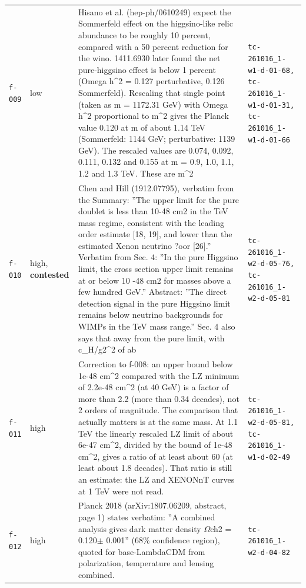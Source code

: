 \documentclass[11pt,a4paper]{article}
\begin{document}
\begin{longtable}{@{}p{}p{}p{}p{}@{}}
\texttt{f-009} & low & Hisano et al. (hep-ph/0610249) expect the Sommerfeld effect on the higgsino-like relic abundance to be roughly 10 percent, compared with a 50 percent reduction for the wino. 1411.6930 later found the net pure-higgsino effect is below 1 percent (Omega h\textasciicircum{}2 = 0.127 perturbative, 0.126 Sommerfeld). Rescaling that single point (taken as m = 1172.31 GeV) with Omega h\textasciicircum{}2 proportional to m\textasciicircum{}2 gives the Planck value 0.120 at m of about 1.14 TeV (Sommerfeld: 1144 GeV; perturbative: 1139 GeV). The rescaled values are 0.074, 0.092, 0.111, 0.132 and 0.155 at m = 0.9, 1.0, 1.1, 1.2 and 1.3 TeV. These are m\textasciicircum{}2  & \texttt{tc-261016\_\allowbreak{}1-w1-d-01-68,\allowbreak{} tc-261016\_\allowbreak{}1-w1-d-01-31,\allowbreak{} tc-261016\_\allowbreak{}1-w1-d-01-66} \\
\texttt{f-010} & high, \textbf{contested} & Chen and Hill (1912.07795), verbatim from the Summary: ''The upper limit for the pure doublet is less than 10-48 cm2 in the TeV mass regime, consistent with the leading order estimate [18, 19], and lower than the estimated Xenon neutrino ?oor [26].'' Verbatim from Sec. 4: ''In the pure Higgsino limit, the cross section upper limit remains at or below 10 -48 cm2 for masses above a few hundred GeV.'' Abstract: ''The direct detection signal in the pure Higgsino limit remains below neutrino backgrounds for WIMPs in the TeV mass range.'' Sec. 4 also says that away from the pure limit, with c\_H/g2\textasciicircum{}2 of ab & \texttt{tc-261016\_\allowbreak{}1-w2-d-05-76,\allowbreak{} tc-261016\_\allowbreak{}1-w2-d-05-81} \\
\texttt{f-011} & high & Correction to f-008: an upper bound below 1e-48 cm\textasciicircum{}2 compared with the LZ minimum of 2.2e-48 cm\textasciicircum{}2 (at 40 GeV) is a factor of more than 2.2 (more than 0.34 decades), not 2 orders of magnitude. The comparison that actually matters is at the same mass. At 1.1 TeV the linearly rescaled LZ limit of about 6e-47 cm\textasciicircum{}2, divided by the bound of 1e-48 cm\textasciicircum{}2, gives a ratio of at least about 60 (at least about 1.8 decades). That ratio is still an estimate: the LZ and XENONnT curves at 1 TeV were not read. & \texttt{tc-261016\_\allowbreak{}1-w2-d-05-81,\allowbreak{} tc-261016\_\allowbreak{}1-w1-d-02-49} \\
\texttt{f-012} & high & Planck 2018 (arXiv:1807.06209, abstract, page 1) states verbatim: ''A combined analysis gives dark matter density $\Omega$ch2 = 0.120$\pm$ 0.001'' (68\% confidence region), quoted for base-LambdaCDM from polarization, temperature and lensing combined. & \texttt{tc-261016\_\allowbreak{}1-w2-d-04-82} \\

\end{longtable}
\end{document}
